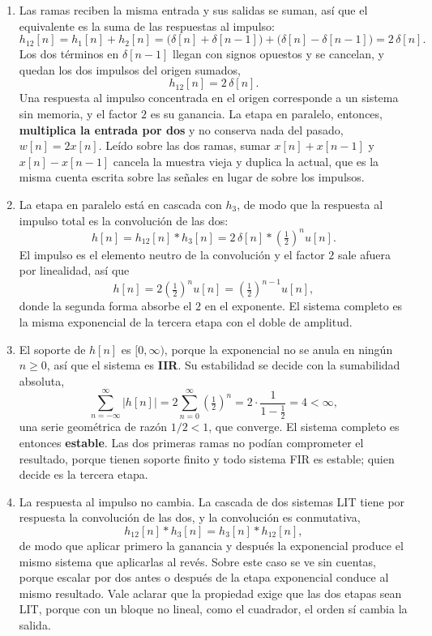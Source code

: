 \documentclass[10pt,a4paper]{article}
\begin{document}
	\begin{enumerate}
		\item Las ramas reciben la misma entrada y sus
		salidas se suman, así que el equivalente es la suma de las respuestas al impulso:
		\[
			h_{12}[n] = h_1[n]+h_2[n]
			= \bigl(\delta[n]+\delta[n-1]\bigr) + \bigl(\delta[n]-\delta[n-1]\bigr)
			= 2\,\delta[n].
		\]
		Los dos términos en $\delta[n-1]$ llegan con signos opuestos y se cancelan, y quedan
		los dos impulsos del origen sumados,
		\[
			\boxed{\;h_{12}[n] = 2\,\delta[n].\;}
		\]
		Una respuesta al impulso concentrada en el origen corresponde a un sistema sin
		memoria, y el factor $2$ es su ganancia. La etapa en paralelo, entonces,
		\textbf{multiplica la entrada por dos} y no conserva nada del pasado, $w[n]=2x[n]$.
		Leído sobre las dos ramas, sumar $x[n]+x[n-1]$ y $x[n]-x[n-1]$ cancela la muestra
		vieja y duplica la actual, que es la misma cuenta escrita sobre las señales en lugar
		de sobre los impulsos.

		\item La etapa en paralelo está en cascada con $h_3$,
		de modo que la respuesta al impulso total es la convolución de las dos:
		\[
			h[n] = h_{12}[n] * h_3[n] = 2\,\delta[n] * \left(\tfrac{1}{2}\right)^{\!n} u[n].
		\]
		El impulso es el elemento neutro de la convolución y el factor $2$ sale afuera por
		linealidad, así que
		\[
			\boxed{\;h[n] = 2\left(\tfrac{1}{2}\right)^{\!n} u[n]
			= \left(\tfrac{1}{2}\right)^{\!n-1} u[n],\;}
		\]
		donde la segunda forma absorbe el $2$ en el exponente. El sistema completo es la
		misma exponencial de la tercera etapa con el doble de amplitud.

		\item El soporte de $h[n]$ es $[0,\infty)$, porque
		la exponencial no se anula en ningún $n\ge 0$, así que el sistema es \textbf{IIR}. Su
		estabilidad se decide con la sumabilidad absoluta,
		\[
			\sum_{n=-\infty}^{\infty}|h[n]| = 2\sum_{n=0}^{\infty}\left(\tfrac{1}{2}\right)^{\!n}
			= 2 \cdot \frac{1}{1-\tfrac{1}{2}} = 4 < \infty,
		\]
		una serie geométrica de razón $1/2 < 1$, que converge. El sistema completo es
		entonces \textbf{estable}. Las dos primeras ramas no podían comprometer el
		resultado, porque tienen soporte finito y todo sistema FIR es estable; quien decide
		es la tercera etapa.

		\item La respuesta al impulso no cambia. La cascada
		de dos sistemas LIT tiene por respuesta la convolución de las dos, y la convolución
		es conmutativa,
		\[
			h_{12}[n] * h_3[n] = h_3[n] * h_{12}[n],
		\]
		de modo que aplicar primero la ganancia y después la exponencial produce el mismo
		sistema que aplicarlas al revés. Sobre este caso se ve sin cuentas, porque escalar
		por dos antes o después de la etapa exponencial conduce al mismo resultado. Vale
		aclarar que la propiedad exige que las dos etapas sean LIT, porque con un bloque no
		lineal, como el cuadrador, el orden sí cambia la salida.
	\end{enumerate}
\end{document}
